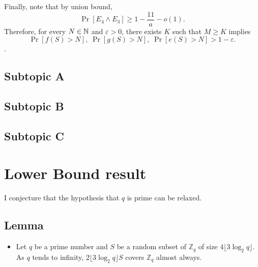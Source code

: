 Finally, note that by union bound, 
\[\Pr[E_4 \land E_3] \geq 1 - \frac{11}{a} - o(1).\] 
Therefore, for every $N \in \mathbb{N}$ and $\varepsilon > 0$, there exists $K$ such that $M \geq K$ implies \[\Pr[f(S) > N], \; \Pr[g(S) > N], \; \Pr[e(S) > N] > 1 - \varepsilon.\].

\subsection{Subtopic A}\label{sec:contrib3:theme1:A}

\subsection{Subtopic B}\label{sec:contrib3:theme1:B}

\subsection{Subtopic C}\label{sec:contrib3:theme1:C}

\section{Lower Bound result}\label{sec:contrib3:theme2}

I conjecture that the hypothesis that $q$ is prime can be relaxed.
\subsection{Lemma}
\begin{itemize}
    \item Let $q$ be a prime number and $S$ be a random subset of $\mathbb{Z}_q$ of size $4\lfloor3\log_2 q\rfloor$. As $q$ tends to infinity, $2\lfloor3\log_2 q\rfloor S$ covers $\mathbb{Z}_q$ almost always. 
\end{itemize}

